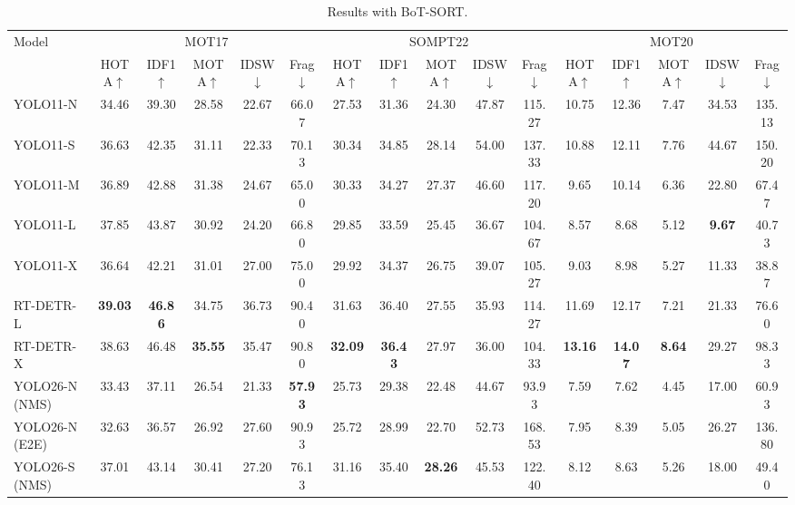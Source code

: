 \begin{table}[!thb]
\centering
\caption{Results with BoT-SORT.}
\label{tab:quality_botsort}
\scriptsize
\setlength{\tabcolsep}{3pt}
\begin{tabular}{l *{15}{c}}
\toprule
\multirow{2}{*}{Model} & \multicolumn{5}{c}{MOT17} & \multicolumn{5}{c}{SOMPT22} & \multicolumn{5}{c}{MOT20} \\
\cmidrule(lr){2-6} \cmidrule(lr){7-11} \cmidrule(lr){12-16}
 & HOTA$\uparrow$ & IDF1$\uparrow$ & MOTA$\uparrow$ & IDSW$\downarrow$ & Frag$\downarrow$
 & HOTA$\uparrow$ & IDF1$\uparrow$ & MOTA$\uparrow$ & IDSW$\downarrow$ & Frag$\downarrow$
 & HOTA$\uparrow$ & IDF1$\uparrow$ & MOTA$\uparrow$ & IDSW$\downarrow$ & Frag$\downarrow$ \\
\midrule
YOLO11-N       & 34.46 & 39.30 & 28.58 & 22.67 &  66.07 & 27.53 & 31.36 & 24.30 & 47.87 & 115.27 & 10.75 & 12.36 & 7.47 & 34.53 & 135.13 \\
YOLO11-S       & 36.63 & 42.35 & 31.11 & 22.33 &  70.13 & 30.34 & 34.85 & 28.14 & 54.00 & 137.33 & 10.88 & 12.11 & 7.76 & 44.67 & 150.20 \\
YOLO11-M       & 36.89 & 42.88 & 31.38 & 24.67 &  65.00 & 30.33 & 34.27 & 27.37 & 46.60 & 117.20 &  9.65 & 10.14 & 6.36 & 22.80 &  67.47 \\
YOLO11-L       & 37.85 & 43.87 & 30.92 & 24.20 &  66.80 & 29.85 & 33.59 & 25.45 & 36.67 & 104.67 &  8.57 &  8.68 & 5.12 & \textbf{9.67} &  40.73 \\
YOLO11-X       & 36.64 & 42.21 & 31.01 & 27.00 &  75.00 & 29.92 & 34.37 & 26.75 & 39.07 & 105.27 &  9.03 &  8.98 & 5.27 & 11.33 &  38.87 \\
\midrule
RT-DETR-L      & \textbf{39.03} & \textbf{46.86} & 34.75 & 36.73 &  90.40 & 31.63 & 36.40 & 27.55 & 35.93 & 114.27 & 11.69 & 12.17 & 7.21 & 21.33 &  76.60 \\
RT-DETR-X      & 38.63 & 46.48 & \textbf{35.55} & 35.47 &  90.80 & \textbf{32.09} & \textbf{36.43} & 27.97 & 36.00 & 104.33 & \textbf{13.16} & \textbf{14.07} & \textbf{8.64} & 29.27 &  98.33 \\
\midrule
YOLO26-N (NMS) & 33.43 & 37.11 & 26.54 & 21.33 & \textbf{57.93} & 25.73 & 29.38 & 22.48 & 44.67 &  93.93 &  7.59 &  7.62 & 4.45 & 17.00 &  60.93 \\
YOLO26-N (E2E) & 32.63 & 36.57 & 26.92 & 27.60 &  90.93 & 25.72 & 28.99 & 22.70 & 52.73 & 168.53 &  7.95 &  8.39 & 5.05 & 26.27 & 136.80 \\
YOLO26-S (NMS) & 37.01 & 43.14 & 30.41 & 27.20 &  76.13 & 31.16 & 35.40 & \textbf{28.26} & 45.53 & 122.40 &  8.12 &  8.63 & 5.26 & 18.00 &  49.40 \\

\end{tabular}
\end{table}

